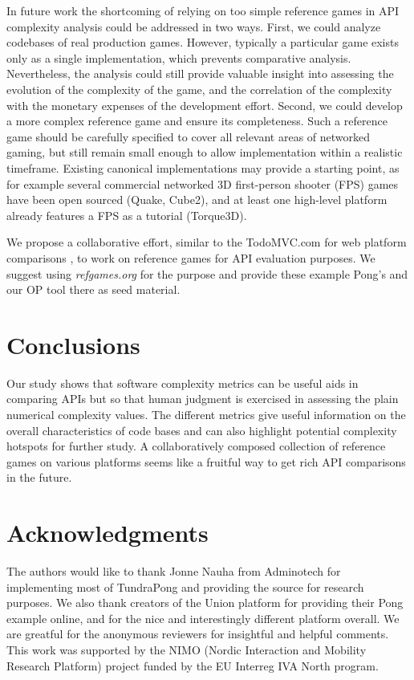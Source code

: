 \documentclass[conference]{IEEEtran}
\begin{document}
In future work the shortcoming of relying on too simple reference
games in API complexity analysis could be addressed in two
ways. First, we could analyze codebases of real production
games. However, typically a particular game exists only as a single
implementation, which prevents comparative analysis. Nevertheless, the
analysis could still provide valuable insight into assessing the
evolution of the complexity of the game, and the correlation of the
complexity with the monetary expenses of the development
effort. Second, we could develop a more complex reference game and
ensure its completeness. Such a reference game should be carefully
specified to cover all relevant areas of networked gaming, but still
remain small enough to allow implementation within a realistic
timeframe. Existing canonical implementations may provide a starting
point, as for example several commercial networked 3D first-person
shooter (FPS) games have been open sourced (Quake, Cube2), and at
least one high-level platform already features a FPS as a tutorial
(Torque3D).

We propose a collaborative effort, similar to the TodoMVC.com for web
platform comparisons \cite{todomvc}, to work on reference games for
API evaluation purposes. We suggest using \emph{refgames.org} for the purpose
and provide these example Pong's and our OP tool there as seed material.

\section{Conclusions}

Our study shows that software complexity metrics can be useful aids in
comparing APIs but so that human judgment is exercised in assessing
the plain numerical complexity values. The different metrics give
useful information on the overall characteristics of code bases and
can also highlight potential complexity hotspots for further study. 
A collaboratively composed collection of reference games on various platforms
seems like a fruitful way to get rich API comparisons in the future.

\section*{Acknowledgments}
The authors would like to thank Jonne Nauha from Adminotech for implementing most of TundraPong and providing the source for research purposes.
We also thank creators of the Union platform for providing their Pong example online, and for the nice and interestingly different platform overall.
We are greatful for the anonymous reviewers for insightful and helpful comments.
This work was supported by the NIMO (Nordic Interaction and Mobility Research Platform) project funded by the EU Interreg IVA North program.



\end{document}
